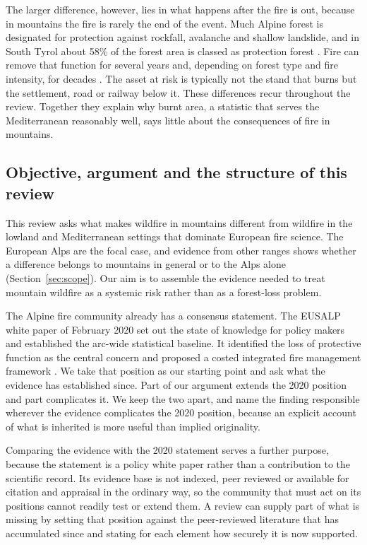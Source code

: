 \documentclass[11pt,a4paper]{article}
\begin{document}
The larger difference, however, lies in what happens after the fire is out, because in mountains the fire is rarely the end of the event. Much Alpine forest is designated for protection against rockfall, avalanche and shallow landslide, and in South Tyrol about 58\% of the forest area is classed as protection forest \citep{hillebrand_contrasting_2023}. Fire can remove that function for several years and, depending on forest type and fire intensity, for decades \citep{melzner_wildfire-induced_2025, melzner_brief_2019}. The asset at risk is typically not the stand that burns but the settlement, road or railway below it. These differences recur throughout the review. Together they explain why burnt area, a statistic that serves the Mediterranean reasonably well, says little about the consequences of fire in mountains.

\subsection{Objective, argument and the structure of this review}

This review asks what makes wildfire in mountains different from wildfire in the lowland and Mediterranean settings that dominate European fire science. The European Alps are the focal case, and evidence from other ranges shows whether a difference belongs to mountains in general or to the Alps alone (Section~\ref{sec:scope}). Our aim is to assemble the evidence needed to treat mountain wildfire as a systemic risk rather than as a forest-loss problem.

The Alpine fire community already has a consensus statement. The EUSALP white paper of February 2020 set out the state of knowledge for policy makers and established the arc-wide statistical baseline. It identified the loss of protective function as the central concern and proposed a costed integrated fire management framework \citep{muller_forest_2020}. We take that position as our starting point and ask what the evidence has established since. Part of our argument extends the 2020 position and part complicates it. We keep the two apart, and name the finding responsible wherever the evidence complicates the 2020 position, because an explicit account of what is inherited is more useful than implied originality.

Comparing the evidence with the 2020 statement serves a further purpose, because the statement is a policy white paper rather than a contribution to the scientific record. Its evidence base is not indexed, peer reviewed or available for citation and appraisal in the ordinary way, so the community that must act on its positions cannot readily test or extend them. A review can supply part of what is missing by setting that position against the peer-reviewed literature that has accumulated since and stating for each element how securely it is now supported.
\end{document}
